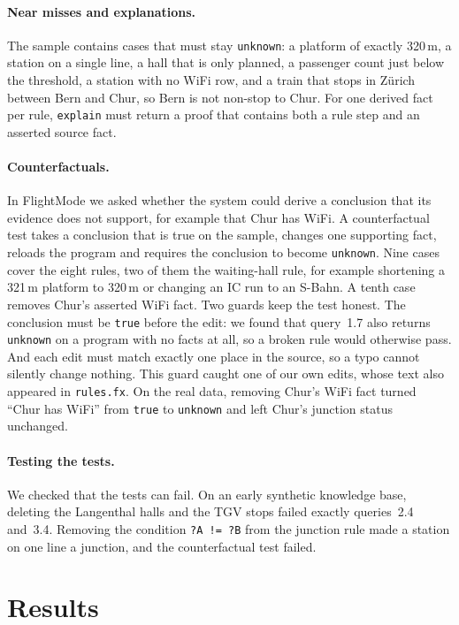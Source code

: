 \documentclass[10pt]{article}
\begin{document}
\paragraph{Near misses and explanations.}
The sample contains cases that must stay \texttt{unknown}: a platform of exactly 320\,m, a station on a single line, a hall that is only planned, a passenger count just below the threshold, a station with no WiFi row, and a train that stops in Z\"urich between Bern and Chur, so Bern is not non-stop to Chur. For one derived fact per rule, \texttt{explain} must return a proof that contains both a rule step and an asserted source fact.

\paragraph{Counterfactuals.}
In FlightMode we asked whether the system could derive a conclusion that its evidence does not support, for example that Chur has WiFi. A counterfactual test takes a conclusion that is true on the sample, changes one supporting fact, reloads the program and requires the conclusion to become \texttt{unknown}. Nine cases cover the eight rules, two of them the waiting-hall rule, for example shortening a 321\,m platform to 320\,m or changing an IC run to an S-Bahn. A tenth case removes Chur's asserted WiFi fact. Two guards keep the test honest. The conclusion must be \texttt{true} before the edit: we found that query~1.7 also returns \texttt{unknown} on a program with no facts at all, so a broken rule would otherwise pass. And each edit must match exactly one place in the source, so a typo cannot silently change nothing. This guard caught one of our own edits, whose text also appeared in \texttt{rules.fx}. On the real data, removing Chur's WiFi fact turned ``Chur has WiFi'' from \texttt{true} to \texttt{unknown} and left Chur's junction status unchanged.

\paragraph{Testing the tests.}
We checked that the tests can fail. On an early synthetic knowledge base, deleting the Langenthal halls and the TGV stops failed exactly queries~2.4 and~3.4. Removing the condition \texttt{?A != ?B} from the junction rule made a station on one line a junction, and the counterfactual test failed.

\section{Results}
\label{sec:results}
\end{document}
